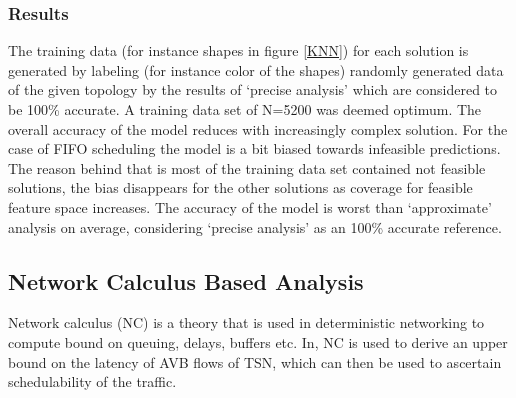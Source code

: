 \documentclass[journal,12pt,twocolumn]{IEEEtran}
\begin{document}
\subsubsection{Results}
The training data (for instance shapes in figure \ref{KNN}) for each solution is generated by labeling (for instance color of the shapes) randomly generated data of the given topology by the results of `precise analysis' \cite{8,9,37} which are considered to be 100\% accurate. A training data set of N=5200 was deemed optimum.
The overall accuracy of the model reduces with increasingly complex solution. For the case of FIFO scheduling the model is a bit biased towards infeasible predictions. The reason behind that is most of the training data set contained not feasible solutions, the bias disappears for the other solutions as coverage for feasible feature space increases. The accuracy of the model is worst than `approximate' analysis on average, considering `precise analysis' as an 100\% accurate reference.
\subsection {Network Calculus Based Analysis}
Network calculus (NC) is a theory that is used in deterministic networking to compute bound on queuing, delays, buffers etc. In\cite{NC}, NC is used to derive an upper bound on the latency of AVB flows of TSN, which can then be used to ascertain schedulability of the traffic.
\end{document}
